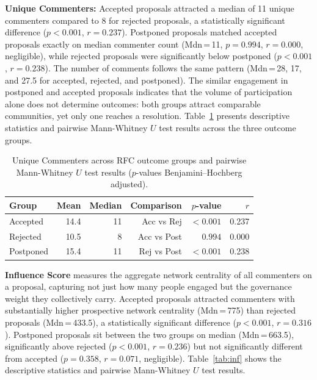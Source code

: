 \documentclass[conference]{IEEEtran}
\begin{document}
\textbf{Unique Commenters:} Accepted proposals attracted a median of 11 unique commenters compared to 8 for rejected proposals, a statistically significant difference ($p {<} 0.001$, $r = 0.237$). Postponed proposals matched accepted proposals exactly on median commenter count (Mdn\,=\,11, $p = 0.994$, $r = 0.000$, negligible), while rejected proposals were significantly below postponed ($p {<} 0.001$, $r = 0.238$). The number of comments follows the same pattern (Mdn\,=\,28, 17, and 27.5 for accepted, rejected, and postponed). The similar engagement in postponed and accepted proposals indicates that the volume of participation alone does not determine outcomes: both groups attract comparable communities, yet only one reaches a resolution. Table~\ref{tab:uc} presents descriptive statistics and pairwise Mann-Whitney $U$ test results across the three outcome groups.

\vspace{-10pt}
\begin{table}[h]
\centering
\caption{Unique Commenters across RFC outcome groups and pairwise Mann-Whitney $U$ test results ($p$-values Benjamini--Hochberg adjusted).}
\label{tab:uc}
\begin{tabular}{lrrrrr}
\toprule
\textbf{Group}
  & \textbf{Mean}
  & \textbf{Median}
  & \textbf{Comparison}
  & \textbf{$p$-value}
  & \textbf{$r$} \\
\midrule
Accepted  & 14.4 & 11
  & Acc vs Rej & ${<}0.001$ & 0.237 \\
Rejected  & 10.5 & 8
  & Acc vs Post & $0.994$ & 0.000 \\
Postponed & 15.4 & 11
  & Rej vs Post & ${<}0.001$ & 0.238 \\
\bottomrule
\end{tabular}
\end{table}

\textbf{Influence Score} measures the aggregate network centrality of all commenters on a proposal, capturing not just how many people engaged but the governance weight they collectively carry. Accepted proposals attracted commenters with substantially higher prospective network centrality (Mdn\,=\,775) than rejected proposals (Mdn\,=\,433.5), a statistically significant difference ($p {<} 0.001$, $r = 0.316$). Postponed proposals sit between the two groups on median (Mdn\,=\,663.5), significantly above rejected ($p {<} 0.001$, $r = 0.236$) but not significantly different from accepted ($p = 0.358$, $r = 0.071$, negligible). Table~\ref{tab:inf} shows the descriptive statistics and pairwise Mann-Whitney $U$ test results.
\end{document}
